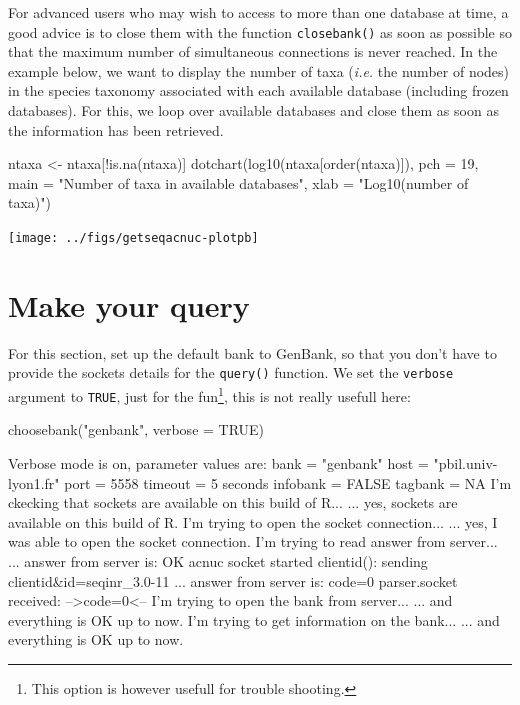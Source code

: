 \documentclass{article}
\begin{document}
For advanced users who may wish to access to more than one database at time, a good advice
is to close them with the function \texttt{closebank()} as soon as possible so that the maximum
number of simultaneous connections is never reached. In the example below, we want to
display the number of taxa (\textit{i.e.} the number of nodes) in the species taxonomy associated
with each available database (including frozen databases). For this, we loop over available databases and 
close them as soon as the information has been retrieved.

\begin{Schunk}
\end{Schunk}

\begin{Schunk}
\begin{Sinput}
 ntaxa <- ntaxa[!is.na(ntaxa)]
 dotchart(log10(ntaxa[order(ntaxa)]), pch = 19,
 main = "Number of taxa in available databases",
 xlab = "Log10(number of taxa)")
\end{Sinput}
\end{Schunk}
\texttt{[image: ../figs/getseqacnuc-plotpb]}

\section{Make your query}

For this section, set up the default bank to GenBank, so that you don't have 
to provide the sockets details for the \texttt{query()} function. We set the
\texttt{verbose} argument to \texttt{TRUE}, just for the fun\footnote{%
This option is however usefull for trouble shooting.}, this is not
really usefull here:

\begin{Schunk}
\begin{Sinput}
 choosebank("genbank", verbose = TRUE)
\end{Sinput}
\begin{Soutput}
Verbose mode is on, parameter values are:
  bank =  "genbank" 
  host =  "pbil.univ-lyon1.fr" 
  port =  5558 
  timeout =  5 seconds 
  infobank =  FALSE 
  tagbank =  NA 
I'm ckecking that sockets are available on this build of R...
... yes, sockets are available on this build of R.
I'm trying to open the socket connection...
... yes, I was able to open the socket connection.
I'm trying to read answer from server...
... answer from server is: OK acnuc socket started 
clientid(): sending clientid&id=seqinr_3.0-11 
... answer from server is: code=0 
parser.socket received: -->code=0<--
I'm trying to open the bank from server...
... and everything is OK up to now.
I'm trying to get information on the bank...
... and everything is OK up to now.
\end{Soutput}
\end{Schunk}
\end{document}

